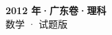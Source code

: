 \documentclass[zihao=-4, a4paper]{ctexart}
\begin{document}
\begin{center}
  {\Large\bfseries 2012 年·广东卷·理科}\\[4pt]
  {\large 数学 · 试题版}
\end{center}
\medskip
{}

\end{document}
